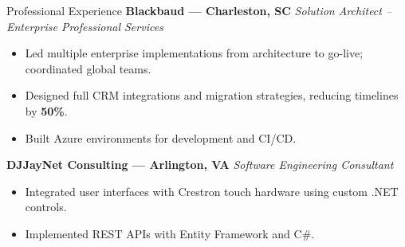 \begin{rubric}{Professional Experience}
    \entry*[2011--2016]
        \textbf{Blackbaud --- Charleston, SC} \emph{Solution Architect – Enterprise Professional Services} \begin{itemize}
            \item Led multiple enterprise implementations from architecture to go-live; coordinated global teams.
            \item Designed full CRM integrations and migration strategies, reducing timelines by \textbf{50\%}.
            \item Built Azure environments for development and CI/CD.
        \end{itemize}
    
    \entry*[2005--2011]
        \textbf{DJJayNet Consulting --- Arlington, VA}
        \emph{Software Engineering Consultant}
        \begin{itemize}
            \item Integrated user interfaces with Crestron touch hardware using custom .NET controls.
            \item Implemented REST APIs with Entity Framework and C\#.
        \end{itemize}
    
\end{rubric}